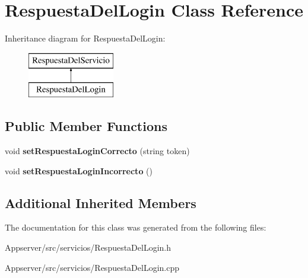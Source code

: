 \hypertarget{classRespuestaDelLogin}{}\section{Respuesta\+Del\+Login Class Reference}
\label{classRespuestaDelLogin}
Inheritance diagram for Respuesta\+Del\+Login\+:\begin{figure}[H]
\begin{center}
\leavevmode
\includegraphics[height=2.000000cm]{classRespuestaDelLogin}
\end{center}
\end{figure}
\subsection*{Public Member Functions}
\begin{DoxyCompactItemize}
\item 
void {\bfseries set\+Respuesta\+Login\+Correcto} (string token)\hypertarget{classRespuestaDelLogin_a350ec1b94bfa7ab5510001b48f63f110}{}\label{classRespuestaDelLogin_a350ec1b94bfa7ab5510001b48f63f110}

\item 
void {\bfseries set\+Respuesta\+Login\+Incorrecto} ()\hypertarget{classRespuestaDelLogin_a890dd2d91994441c0e309c99fcc60147}{}\label{classRespuestaDelLogin_a890dd2d91994441c0e309c99fcc60147}

\end{DoxyCompactItemize}
\subsection*{Additional Inherited Members}


The documentation for this class was generated from the following files\+:\begin{DoxyCompactItemize}
\item 
Appserver/src/servicios/Respuesta\+Del\+Login.\+h\item 
Appserver/src/servicios/Respuesta\+Del\+Login.\+cpp\end{DoxyCompactItemize}
